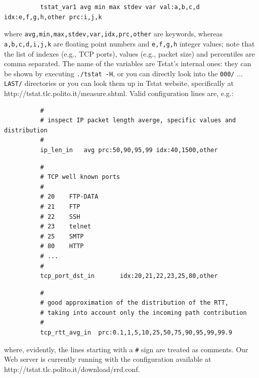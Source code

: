 \documentclass[11pt]{article}
\begin{document}
\begin{small}\begin{verbatim}
          tstat_var1 avg min max stdev var val:a,b,c,d idx:e,f,g,h,other prc:i,j,k
\end{verbatim}\end{small} \noindent
where \texttt{avg,min,max,stdev,var,idx,prc,other} are keywords, whereas \texttt{a,b,c,d,i,j,k} 
are floating point numbers and \texttt{e,f,g,h} integer values; note that
the list of indexes (e.g., TCP ports), values (e.g., packet size)
and percentiles are comma separated. The name of the variables are
Tstat's internal ones: they can be shown by executing \texttt{./tstat -H},
or you can directly look into the \texttt{000/} ...  \texttt{LAST/}  directories or
you can look them up in Tstat website, specifically at \textsf{http://tstat.tlc.polito.it/measure.shtml}. 
Valid configuration lines are, e.g.:

\begin{small}\begin{verbatim}
          #
          # inspect IP packet length averge, specific values and distribution
          #
          ip_len_in   avg prc:50,90,95,99 idx:40,1500,other
\end{verbatim}\end{small} \noindent
\begin{small}\begin{verbatim}
          #
          # TCP well known ports       
          #                       
          # 20    FTP-DATA             
          # 21    FTP                  
          # 22    SSH                  
          # 23    telnet               
          # 25    SMTP                 
          # 80    HTTP                 
          # ...                        
          #
          tcp_port_dst_in       idx:20,21,22,23,25,80,other
\end{verbatim}\end{small} \noindent
\begin{small}\begin{verbatim}
          #
          # good approximation of the distribution of the RTT,
          # taking into account only the incoming path contribution
          #
          tcp_rtt_avg_in  prc:0.1,1,5,10,25,50,75,90,95,99,99.9
\end{verbatim}\end{small} \noindent
where, evidently, the lines starting with a \texttt{\#} sign are treated as comments.
Our Web server is currently running with the configuration
available at \textsf{http://tstat.tlc.polito.it/download/rrd.conf}.
\end{document}
